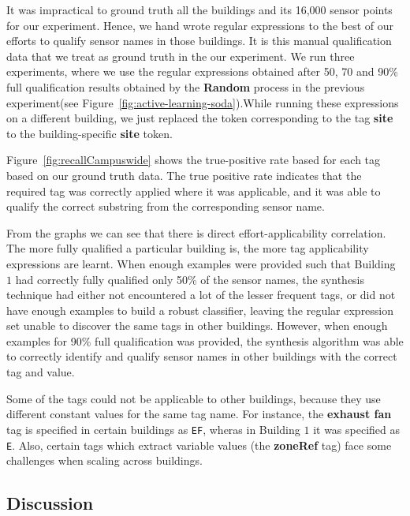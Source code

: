 It was impractical to ground truth all the buildings and its 16,000 sensor points for our experiment. Hence, we hand wrote regular expressions to the best of our efforts to qualify sensor names in those buildings. It is this manual qualification data that we treat as ground truth in the our experiment. We run three experiments, where we use the regular expressions obtained after 50, 70 and 90\% full qualification results obtained by the {\bf Random} process in the previous experiment(see Figure~\ref{fig:active-learning-soda}).While running these expressions on a different building, we just replaced the token corresponding to the tag {\bf site} to the building-specific {\bf site}  token. 

Figure~\ref{fig:recallCampuswide} shows the true-positive rate based for each tag based on our ground truth data. The true positive rate indicates that the required tag was correctly applied where it was applicable, and it was able to qualify the correct substring from the corresponding sensor name. 

From the graphs we can see that there is direct effort-applicability correlation. The more fully qualified a particular building is, the more tag applicability expressions are learnt. When enough examples were provided such that Building $1$ had correctly fully qualified only 50\% of the sensor names, the synthesis technique had either not encountered a lot of the lesser frequent tags, or did not have enough examples to build a robust classifier, leaving the regular expression set unable to discover the same tags in other buildings. However, when enough examples for 90\% full qualification was provided, the synthesis algorithm was able to correctly identify and qualify sensor names in other buildings with the correct tag and value. 

Some of the tags could not be applicable to other buildings, because they use different constant values for the same tag name. For instance, the {\bf exhaust fan} tag is specified in certain buildings as \texttt{EF}, wheras in Building $1$ it was specified as \texttt{E}. Also, certain tags which extract variable values (the {\bf zoneRef} tag) face some challenges when scaling across buildings. 

\subsection{Discussion}



